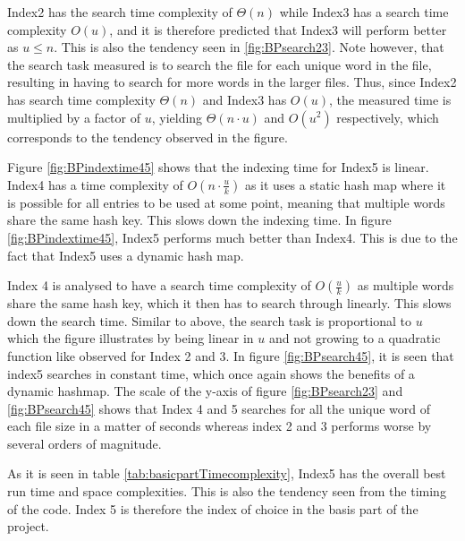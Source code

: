 Index2 has the search time complexity of $\Theta(n)$ while Index3 has a search time complexity $O(u)$, and it is therefore predicted that Index3 will perform better as $u\leq n$. This is also the tendency seen in \ref{fig:BPsearch23}. Note however, that the search task measured is to search the file for each unique word in the file, resulting in having to search for more words in the larger files. Thus, since Index2 has search time complexity $\Theta(n)$ and Index3 has $O(u)$, the measured time is multiplied by a factor of $u$, yielding $\Theta(n\cdot u)$ and $O(u^2)$ respectively, which corresponds to the tendency observed in the figure. 

Figure \ref{fig:BPindextime45} shows that the indexing time for Index5 is linear. Index4 has a time complexity of $O(n\cdot \frac{u}{k})$ as it uses a static hash map where it is possible for all entries to be used at some point, meaning that multiple words share the same hash key. This slows down the indexing time. 
In figure \ref{fig:BPindextime45}, Index5 performs much better than Index4. This is due to the fact that Index5 uses a dynamic hash map. 

 Index 4 is analysed to have a search time complexity of $O(\frac{u}{k})$ as multiple words share the same hash key, which it then has to search through linearly. This slows down the search time. Similar to above, the search task is proportional to $u$ which the figure illustrates by being linear in $u$ and not growing to a quadratic function like observed for Index 2 and 3. In figure \ref{fig:BPsearch45}, it is seen that index5 searches in constant time, which once again shows the benefits of a dynamic hashmap. The scale of the y-axis of figure \ref{fig:BPsearch23} and \ref{fig:BPsearch45} shows that Index 4 and 5 searches for all the unique word of each file size in a matter of seconds whereas index 2 and 3 performs worse by several orders of magnitude.

 As it is seen in table \ref{tab:basicpartTimecomplexity}, Index5 has the overall best run time and space complexities. This is also the tendency seen from the timing of the code. Index 5 is therefore the index of choice in the basis part of the project.  

